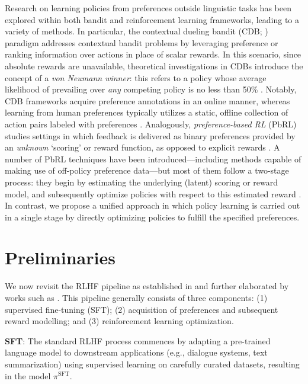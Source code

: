 Research on learning policies from preferences outside linguistic tasks has been explored within both bandit and reinforcement learning frameworks, leading to a variety of methods. In particular, the contextual dueling bandit (CDB; \cite{yue2012karmed,dudik2015contextual}) paradigm addresses contextual bandit problems by leveraging preference or ranking information over actions in place of scalar rewards. In this scenario, since absolute rewards are unavailable, theoretical investigations in CDBs introduce the concept of a \textit{von Neumann winner}: this refers to a policy whose average likelihood of prevailing over \textit{any} competing policy is no less than 50\% \citep{dudik2015contextual}. Notably, CDB frameworks acquire preference annotations in an online manner, whereas learning from human preferences typically utilizes a static, offline collection of action pairs labeled with preferences \citep{yan2022human}. Analogously, \textit{preference-based RL} (PbRL) studies settings in which feedback is delivered as binary preferences provided by an \textit{unknown} `scoring' or reward function, as opposed to explicit rewards \citep{BusaFekete2014,ruiz2023dueling}. A number of PbRL techniques have been introduced—including methods capable of making use of off-policy preference data—but most of them follow a two-stage process: they begin by estimating the underlying (latent) scoring or reward model, and subsequently optimize policies with respect to this estimated reward \citep{jain2013learning,BusaFekete2014,christiano2017deep,sadigh2017active,kupcsik2018learning}. In contrast, we propose a unified approach in which policy learning is carried out in a single stage by directly optimizing policies to fulfill the specified preferences.

\section{Preliminaries}\label{section:prelims}

We now revisit the RLHF pipeline as established in \citeauthor{ziegler2020finetuning} and further elaborated by works such as \citep{stiennon2022learning, bai2022training, ouyang2022training}. This pipeline generally consists of three components: (1) supervised fine-tuning (SFT); (2) acquisition of preferences and subsequent reward modelling; and (3) reinforcement learning optimization.

\textbf{SFT}: The standard RLHF process commences by adapting a pre-trained language model to downstream applications (e.g., dialogue systems, text summarization) using supervised learning on carefully curated datasets, resulting in the model $\pi^\text{SFT}$.

